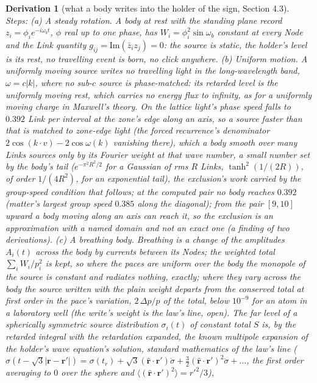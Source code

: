 \documentclass[pdflatex,sn-mathphys-num]{sn-jnl}
\theoremstyle{thmstyleone}
\newtheorem{derivation}{Derivation}
\begin{document}
\begin{derivation}[what a body writes into the holder of the sign, Section 4.3]
\emph{Steps:} (a) \emph{A steady rotation.} A body at rest with the standing plane record $z_i = \phi_i e^{-i\omega_b t}$, $\phi$ real up to one phase, has $W_i = \phi_i^2\sin\omega_b$ constant at every Node and the Link quantity $g_{ij} = \mathrm{Im}(\bar z_i z_j) = 0$: the source is static, the holder's level is its rest, no travelling event is born, no click anywhere. (b) \emph{Uniform motion.} A uniformly moving source writes no travelling light in the long-wavelength band, $\omega = c|k|$, where no sub-$c$ source is phase-matched: its retarded level is the uniformly moving rest, which carries no energy flux to infinity, as for a uniformly moving charge in Maxwell's theory. On the lattice light's phase speed falls to $0.392$ Link per interval at the zone's edge along an axis, so a source faster than that is matched to zone-edge light (the forced recurrence's denominator $2\cos(k\cdot v) - 2\cos\omega(k)$ vanishing there), which a body smooth over many Links sources only by its Fourier weight at that wave number, a small number set by the body's tail ($e^{-\pi^2 R^2 / 2}$ for a Gaussian of rms $R$ Links, $\tanh^2(1 / (2R))$, of order $1 / (4R^2)$, for an exponential tail), the exclusion's work carried by the group-speed condition that follows; at the computed pair no body reaches $0.392$ (matter's largest group speed $0.385$ along the diagonal); from the pair $[9, 10]$ upward a body moving along an axis can reach it, so the exclusion is an approximation with a named domain and not an exact one (a finding of two derivations). (c) \emph{A breathing body.} Breathing is a change of the amplitudes $A_i(t)$ across the body by currents between its Nodes; the weighted total $\sum_i W_i / p_i^2$ is kept, so where the paces are uniform over the body the monopole of the source is constant and radiates nothing, exactly; where they vary across the body the source written with the plain weight departs from the conserved total at first order in the pace's variation, $2\,\Delta p / p$ of the total, below $10^{-9}$ for an atom in a laboratory well (the write's weight is the law's line, open). The far level of a spherically symmetric source distribution $\sigma_i(t)$ of constant total $S$ is, by the retarded integral with the retardation expanded, the known multipole expansion of the holder's wave equation's solution, standard mathematics of the law's line ($\sigma(t - \sqrt 3|\mathbf r - \mathbf r'|) = \sigma(t_r) + \sqrt 3(\hat{\mathbf r}\cdot\mathbf r')\dot\sigma + \tfrac32(\hat{\mathbf r}\cdot\mathbf r')^2\ddot\sigma + \dots$, the first order averaging to $0$ over the sphere and $\langle(\hat{\mathbf r}\cdot\mathbf r')^2\rangle = r'^2 / 3$),

\end{derivation}
\end{document}
